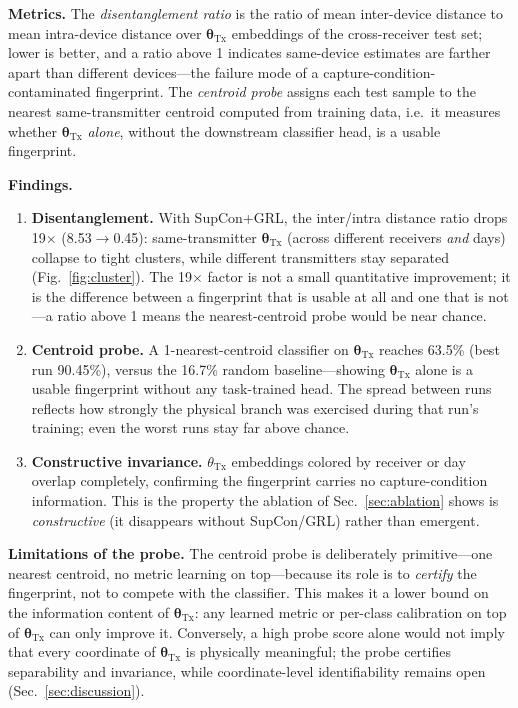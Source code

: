 \documentclass[journal]{IEEEtran}
\newcommand{\tx}{\boldsymbol{\theta}_{\mathrm{Tx}}}
\begin{document}
\textbf{Metrics.} The \emph{disentanglement ratio} is the ratio of mean inter-device distance to mean intra-device distance over $\tx$ embeddings of the cross-receiver test set; lower is better, and a ratio above 1 indicates same-device estimates are farther apart than different devices---the failure mode of a capture-condition-contaminated fingerprint. The \emph{centroid probe} assigns each test sample to the nearest same-transmitter centroid computed from training data, i.e.\ it measures whether $\tx$ \emph{alone}, without the downstream classifier head, is a usable fingerprint.

\textbf{Findings.}
\begin{enumerate}
\item \textbf{Disentanglement.} With SupCon+GRL, the inter/intra distance ratio drops 19$\times$ (8.53$\to$0.45): same-transmitter $\tx$ (across different receivers \emph{and} days) collapse to tight clusters, while different transmitters stay separated (Fig.~\ref{fig:cluster}). The 19$\times$ factor is not a small quantitative improvement; it is the difference between a fingerprint that is usable at all and one that is not---a ratio above 1 means the nearest-centroid probe would be near chance.
\item \textbf{Centroid probe.} A 1-nearest-centroid classifier on $\tx$ reaches 63.5\% (best run 90.45\%), versus the 16.7\% random baseline---showing $\tx$ alone is a usable fingerprint without any task-trained head. The spread between runs reflects how strongly the physical branch was exercised during that run's training; even the worst runs stay far above chance.
\item \textbf{Constructive invariance.} $\theta_{\mathrm{Tx}}$ embeddings colored by receiver or day overlap completely, confirming the fingerprint carries no capture-condition information. This is the property the ablation of Sec.~\ref{sec:ablation} shows is \emph{constructive} (it disappears without SupCon/GRL) rather than emergent.
\end{enumerate}

\textbf{Limitations of the probe.} The centroid probe is deliberately primitive---one nearest centroid, no metric learning on top---because its role is to \emph{certify} the fingerprint, not to compete with the classifier. This makes it a lower bound on the information content of $\tx$: any learned metric or per-class calibration on top of $\tx$ can only improve it. Conversely, a high probe score alone would not imply that every coordinate of $\tx$ is physically meaningful; the probe certifies separability and invariance, while coordinate-level identifiability remains open (Sec.~\ref{sec:discussion}).
\end{document}
